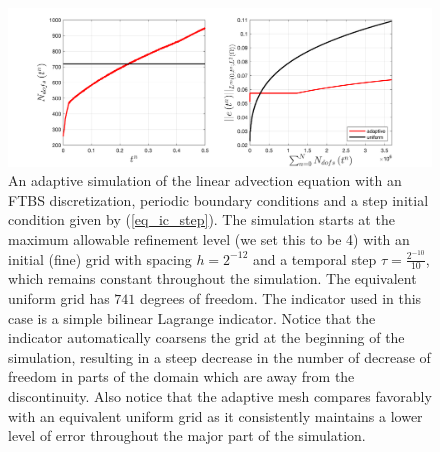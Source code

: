 \documentclass[final]{amsart}
\numberwithin{equation}{section}
\begin{document}
\begin{figure}[H]
\centering
\includegraphics[width=\textwidth]{../figures/fig_FTBSplots_1x5_step_IC_P1_comparison_adaptONOFF}	
	\caption{\label{fig:FTBS_linadvect_adapt} An adaptive simulation of the linear advection equation with an FTBS discretization, periodic boundary conditions and a step initial condition given by (\ref{eq_ic_step}).  The simulation starts at the maximum allowable refinement level (we set this to be 4) with an initial (fine) grid with spacing $h=2^{-12}$ and a temporal step $\tau =\frac{2^{-10}}{10}$, which remains constant throughout the simulation. The equivalent uniform grid has $741$ degrees of freedom.  The indicator used in this case is a simple bilinear Lagrange indicator.  Notice that the indicator automatically coarsens the grid at the beginning of the simulation, resulting in a steep decrease in the number of decrease of freedom in parts of the domain which are away from the discontinuity. Also notice that the adaptive mesh compares favorably with an equivalent uniform grid as it consistently maintains a lower level of error throughout the major part of the simulation.}
\end{figure}
\end{document}
